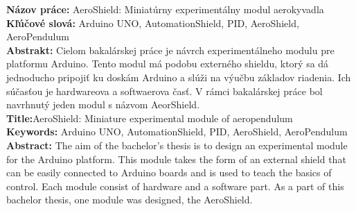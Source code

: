 \noindent
\textbf{Názov práce:} AeroShield: Miniatúrny experimentálny modul aerokyvadla\\
\textbf{Kľúčové slová: } Arduino UNO, AutomationShield, PID, AeroShield, AeroPendulum \\
\textbf{Abstrakt: } Cielom bakalárskej práce je návrch experimentálneho modulu pre platformu Arduino. Tento modul má podobu externého shieldu, ktorý sa dá jednoducho pripojiť ku doskám Arduino a slúži na výučbu základov riadenia. Ich súčasťou je hardwareova a softwaerova časť. V rámci bakalárskej práce bol navrhnutý jeden modul s názvom AeorShield.   \\

\noindent
\textbf{Title:}AeroShield: Miniature experimental module of aeropendulum \\
\textbf{Keywords: }  Arduino UNO, AutomationShield, PID, AeroShield, AeroPendulum\\
\textbf{Abstract: } The aim of the bachelor's thesis is to design an experimental module for the Arduino platform. This module takes the form of an external shield that can be easily connected to Arduino boards and is used to teach the basics of control. Each module consist of hardware and a software part. As a part of this bachelor thesis, one module was designed, the AeroShield.
\cleardoublepage
